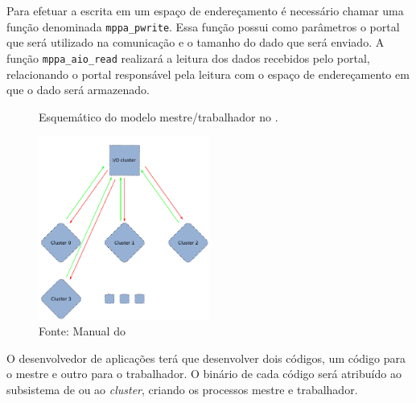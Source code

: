 Para efetuar a escrita em um espaço de endereçamento é necessário chamar uma
função denominada \texttt{mppa\_pwrite}. Essa função possui como parâmetros o
portal que será utilizado na comunicação e o tamanho do dado que será enviado.
A função \texttt{mppa\_aio\_read} realizará a leitura dos dados recebidos pelo
portal, relacionando o portal responsável pela leitura com o espaço de
endereçamento em que o dado será armazenado.

\begin{figure}
	\centering
	\caption{Esquemático do modelo mestre/trabalhador no \mppa.}
	\includegraphics[width=0.5\textwidth]{figs/MPPAIPCTutorial.pdf}
    \caption*{Fonte: Manual do \mppa}
	\label{fig:MPPAIPCTutorial}
\end{figure}


O desenvolvedor de aplicações terá que desenvolver dois
códigos, um código para o mestre e outro para o trabalhador. O binário de cada
código será atribuído ao subsistema de \es ou ao \textit{cluster}, criando os
processos mestre e trabalhador.

